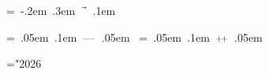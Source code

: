 \newbox\cwbb@pointer
\setbox\cwbb@pointer=\hbox{%
	    \kern -.2em
	    \lower .3em \hbox{$\vec{\kern .5em}$}%
	    \kern .1em
	    }

\newbox\cwbb@decr		%
\setbox\cwbb@decr=\hbox{%
	    \kern .05em
	    \raise .1em \hbox{$\scriptstyle {-}\kern -.1em{-}$}%
	    \kern .05em
	    }
\newbox\cwbb@incr		%
\setbox\cwbb@incr=\hbox{%
	    \kern .05em
	    \raise .1em \hbox{$\scriptstyle {+}\kern -.1em{+}$}%
	    \kern .05em
	    }




\mathchardef\CwebAddress="2026	%
\let\CwebAssign==		%
\let\CwebBinOr=\mid		%
\def\CwebComplement{{\sim}}	%
\def\CwebDecr{\copy\cwbb@decr}	%
\def\CwebIncr{\copy\cwbb@incr}	%
\let\CwebLeftShift=\ll		%
\def\CwebMod{\mathbin{\hbox{\footnotesize\rm\%}}}	%
\def\CwebMemberRef{\mathbin{.*}}	%
\def\CwebPointer{\copy\cwbb@pointer}
\def\CwebPointerMemberRef{\mathbin{\CwebPointer*}} %
\def\CwebRel{\mathrel?}		%
\let\CwebRightShift=\gg		%
\def\CwebScope{\kern.1em{::}\kern.1em}	%

\def\CwebThis{\CwebRes{this}}	%



\def\TeX{%
    {%
	\ifmmode\it\fi
	\mbox{T\kern-.1667em\lower.424ex\hbox{E}\hskip-.125emX}%
    }}



